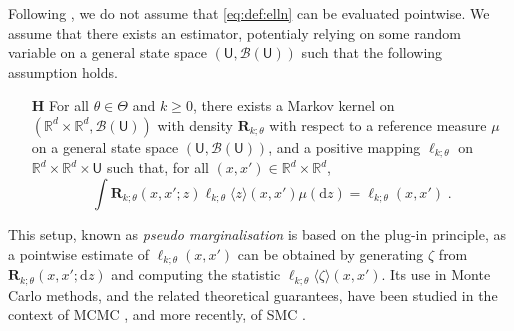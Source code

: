 \documentclass{article}
\def\Xset{\mathbb{R}^d}
\newcommand{\md}[1]{g_{#1}}
\newcommand{\parvec}{\theta}
\newcommand{\parspace}{\Theta}
\newcommand{\hd}[1]{q_{#1}}
\newcommand{\rmd}{\ensuremath{\mathrm{d}}}
\newcommand{\eqsp}{\;}
\newcounter{hypH}
\newenvironment{hypH}{\refstepcounter{hypH}\begin{itemize}
\item[{\bf H\arabic{hypH}}]}{\end{itemize}}
\newcommand{\marginalset}{\mathsf{U}}
\newcommand{\kernelmarg}{\mathbf{R}}
\newcommand{\qg}[1]{\ell_{#1}}
\newcommand{\hatqg}[1]{\mathsf{\ell}_{#1}}
\begin{document}
Following \cite{fearnhead2008particle, olsson2011particle, gloaguen2018online, gloaguen2021pseudo}, we do not assume that  \eqref{eq:def:elln} can be evaluated pointwise.
We assume that there exists an estimator, potentialy relying on some random variable on a general state space $(\marginalset,\mathcal{B}(\marginalset))$ such that the following assumption holds.
\begin{hypH} 
\label{assum:unbiased}
For all $\parvec \in\parspace$ and $k\geqslant 0$, there exists a Markov kernel on $(\Xset\times\Xset,\mathcal{B}(\marginalset))$ with density $\kernelmarg_{k;\parvec}$ with respect to a reference measure $\mu$ on a general state space $(\marginalset,\mathcal{B}(\marginalset))$,  and a positive mapping $\hatqg{k;\parvec}$ on $\Xset\times\Xset\times\marginalset$ such that, for all $(x,x')\in\Xset \times \Xset$,
\begin{equation*}
\int \kernelmarg_{k;\parvec}(x,x';z)\hatqg{k;\parvec}\langle z\rangle(x,x')\mu(\rmd z) =  \qg{k;\parvec}(x,x')\eqsp.
\end{equation*}
\end{hypH}
This setup, known as \textit{pseudo marginalisation} is based on the plug-in principle, as a pointwise estimate of $\qg{k;\parvec}(x,x')$ can be obtained by generating $\zeta$ from $\kernelmarg_{k;\parvec}(x,x';\rmd z)$ and computing the statistic $\hatqg{k;\parvec}\langle \zeta\rangle(x,x')$. 
Its use in Monte Carlo methods, and the related theoretical guarantees, have been studied in the context of MCMC \cite{andrieu2009pseudo}, and more recently, of SMC \cite{gloaguen2021pseudo}.

\end{document}
